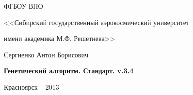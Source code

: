 \thispagestyle{empty}

\begin{center}
ФГБОУ ВПО \par
<<Сибирский государственный аэрокосмический университет \par имени академика М.Ф. Решетнева>>\par 
\par
\end{center}

\vspace{20mm}

\vspace{30mm}
\begin{center}
{\large Сергиенко Антон Борисович}
\end{center}

\vspace{5mm}
\begin{center}
{\bf \large Генетический алгоритм. Стандарт. v.3.4
\par}

\vspace{10mm}

\vspace{10mm}

\end{center}

\vspace{80mm}

\vspace{20mm}
\begin{center}
{Красноярск -- 2013}
\end{center}

\newpage